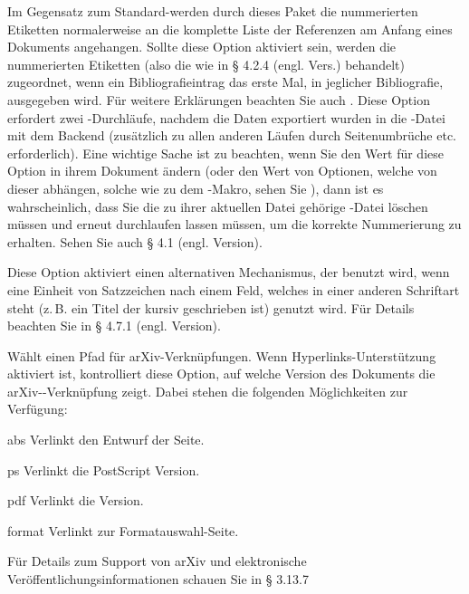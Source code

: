 \documentclass{ltxdockit}[2011/03/25]
\begin{document}
\begin{optionlist}
Im Gegensatz zum Standard-\latex werden durch dieses Paket die nummerierten
Etiketten normalerweise an die komplette Liste der Referenzen am Anfang eines
Dokuments angehangen. Sollte diese Option aktiviert sein, werden die nummerierten
Etiketten (also die  wie in %
§ 4.2.4 (engl. Vers.)
behandelt) zugeordnet, wenn ein Bibliografieintrag das erste Mal, in jeglicher
Bibliografie, ausgegeben wird. Für weitere Erklärungen beachten Sie auch
.
Diese Option erfordert zwei \latex-Durchläufe, nachdem die Daten exportiert wurden in die
-Datei mit dem Backend (zusätzlich zu allen anderen Läufen durch 
Seitenumbrüche etc. erforderlich). Eine wichtige Sache ist zu beachten, wenn Sie den
Wert für diese
Option in ihrem Dokument ändern (oder den Wert von Optionen, welche von dieser abhängen, solche wie zu dem -Makro, sehen Sie ), dann ist es wahrscheinlich, dass Sie die zu ihrer aktuellen Datei gehörige -Datei löschen müssen und \latex erneut durchlaufen lassen müssen, um die korrekte Nummerierung zu erhalten. Sehen Sie auch § 4.1 (engl. Version). %


Diese Option aktiviert einen alternativen Mechanismus, der benutzt wird, wenn
eine Einheit von Satzzeichen nach einem Feld, welches in einer anderen
Schriftart steht (z.\,B. ein Titel der kursiv geschrieben ist) genutzt wird. Für
Details beachten Sie  in § 4.7.1 (engl. Version). %


Wählt einen Pfad für arXiv-Verknüpfungen. Wenn Hyperlinks-Unterstützung
aktiviert ist, kontrolliert diese Option, auf welche Version des Dokuments die
arXiv--Verknüpfung zeigt. Dabei stehen die folgenden Möglichkeiten zur Verfügung:

\begin{valuelist} 
\item[abs] Verlinkt den Entwurf der Seite.  
\item[ps] Verlinkt die PostScript Version.  
\item[pdf] Verlinkt die \pdf Version.  
\item[format] Verlinkt zur Formatauswahl-Seite.  
\end{valuelist} 
%
Für Details zum Support von arXiv und elektronische Veröffentlichungsinformationen
schauen Sie in § 3.13.7%


\end{optionlist}
\end{document}
